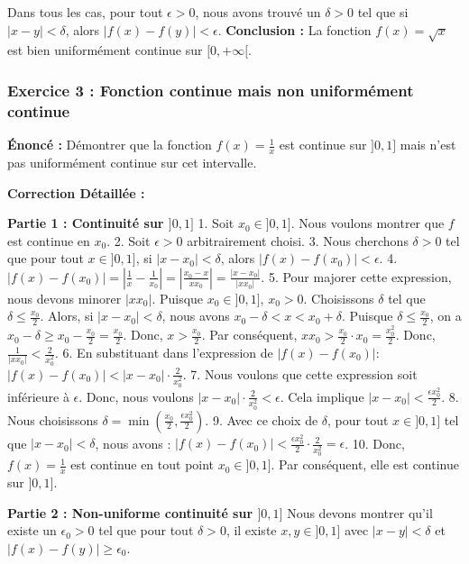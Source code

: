 \documentclass[12pt,a4paper]{report}
\begin{document}
    Dans tous les cas, pour tout $\epsilon > 0$, nous avons trouvé un $\delta > 0$ tel que si $|x - y| < \delta$, alors $|f(x) - f(y)| < \epsilon$.
\textbf{Conclusion :} La fonction $f(x) = \sqrt{x}$ est bien uniformément continue sur $[0, +\infty[$.

\subsubsection{Exercice 3 : Fonction continue mais non uniformément continue}
\textbf{Énoncé :} Démontrer que la fonction $f(x) = \frac{1}{x}$ est continue sur $]0, 1]$ mais n'est pas uniformément continue sur cet intervalle.

\textbf{Correction Détaillée :}

\textbf{Partie 1 : Continuité sur $]0, 1]$}
1.  Soit $x_0 \in ]0, 1]$. Nous voulons montrer que $f$ est continue en $x_0$.
2.  Soit $\epsilon > 0$ arbitrairement choisi.
3.  Nous cherchons $\delta > 0$ tel que pour tout $x \in ]0, 1]$, si $|x - x_0| < \delta$, alors $|f(x) - f(x_0)| < \epsilon$.
4.  $|f(x) - f(x_0)| = \left|\frac{1}{x} - \frac{1}{x_0}\right| = \left|\frac{x_0 - x}{x x_0}\right| = \frac{|x - x_0|}{|x x_0|}$.
5.  Pour majorer cette expression, nous devons minorer $|x x_0|$.
    Puisque $x_0 \in ]0, 1]$, $x_0 > 0$.
    Choisissons $\delta$ tel que $\delta \le \frac{x_0}{2}$.
    Alors, si $|x - x_0| < \delta$, nous avons $x_0 - \delta < x < x_0 + \delta$.
    Puisque $\delta \le \frac{x_0}{2}$, on a $x_0 - \delta \ge x_0 - \frac{x_0}{2} = \frac{x_0}{2}$.
    Donc, $x > \frac{x_0}{2}$.
    Par conséquent, $x x_0 > \frac{x_0}{2} \cdot x_0 = \frac{x_0^2}{2}$.
    Donc, $\frac{1}{|x x_0|} < \frac{2}{x_0^2}$.
6.  En substituant dans l'expression de $|f(x) - f(x_0)|$:
    $|f(x) - f(x_0)| < |x - x_0| \cdot \frac{2}{x_0^2}$.
7.  Nous voulons que cette expression soit inférieure à $\epsilon$. Donc, nous voulons $|x - x_0| \cdot \frac{2}{x_0^2} < \epsilon$.
    Cela implique $|x - x_0| < \frac{\epsilon x_0^2}{2}$.
8.  Nous choisissons $\delta = \min\left(\frac{x_0}{2}, \frac{\epsilon x_0^2}{2}\right)$.
9.  Avec ce choix de $\delta$, pour tout $x \in ]0, 1]$ tel que $|x - x_0| < \delta$, nous avons :
    $|f(x) - f(x_0)| < \frac{\epsilon x_0^2}{2} \cdot \frac{2}{x_0^2} = \epsilon$.
10. Donc, $f(x) = \frac{1}{x}$ est continue en tout point $x_0 \in ]0, 1]$. Par conséquent, elle est continue sur $]0, 1]$.

\textbf{Partie 2 : Non-uniforme continuité sur $]0, 1]$}
Nous devons montrer qu'il existe un $\epsilon_0 > 0$ tel que pour tout $\delta > 0$, il existe $x, y \in ]0, 1]$ avec $|x - y| < \delta$ et $|f(x) - f(y)| \ge \epsilon_0$.
\end{document}
